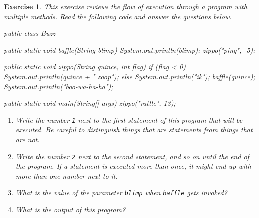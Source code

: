\documentclass[12pt]{book}
\theoremstyle{exercise}
\newtheorem{exercise}{Exercise}[chapter]
\begin{document}
\begin{exercise}
This exercise reviews the flow of execution through a program with multiple methods.
Read the following code and answer the questions below.

\begin{code}
public class Buzz {

    public static void baffle(String blimp) {
        System.out.println(blimp);
        zippo("ping", -5);
    }

    public static void zippo(String quince, int flag) {
        if (flag < 0) {
            System.out.println(quince + " zoop");
        } else {
            System.out.println("ik");
            baffle(quince);
            System.out.println("boo-wa-ha-ha");
        }
    }

    public static void main(String[] args) {
        zippo("rattle", 13);
    }
}
\end{code}

\begin{enumerate}

\item Write the number {\tt 1} next to the first {\em statement} of this program that will be executed.
Be careful to distinguish things that are statements from things that are not.

\item Write the number {\tt 2} next to the second statement, and so on until the end of the program.
If a statement is executed more than once, it might end up with more than one number next to it.

\item What is the value of the parameter {\tt blimp} when {\tt baffle} gets invoked?

\item What is the output of this program?

\end{enumerate}
\end{exercise}
\end{document}
